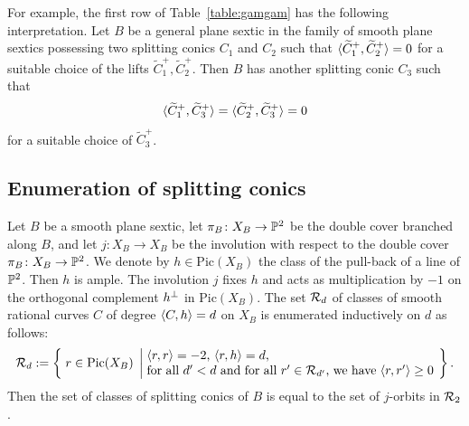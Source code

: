 \documentclass{amsart} %
\newcommand{\ps}{B}
\newcommand{\con}{C}
\newcommand{\wtcon}{\widetilde{\con}}
\newcommand{\pips}{\pi_{\ps}}
\newcommand{\Xps}{X_{\ps}}
\newcommand{\Pic}{\mathrm{Pic}}
\begin{document}
%
For example, the first row of Table~\ref{table:gamgam} has the following interpretation.
Let  $\ps$ be a general plane sextic 
in the family of smooth plane sextics possessing 
two splitting conics $\con_1$ and $\con_2$
such that $\intf{\wtcon_1^+, \wtcon_2^+}=0$  for a suitable choice of the lifts 
$\wtcon_1^+, \wtcon_2^+$.
Then  $\ps$ has another  splitting conic $\con_3$ such that 
\[
\intf{\wtcon_1^+, \wtcon_3^+}=\intf{\wtcon_2^+, \wtcon_3^+}=0
\]
for a suitable choice of $\wtcon_3^+$.
%
\subsection{Enumeration of splitting conics}\label{subsec:enum}
%
Let $\ps$ be a smooth plane sextic,
 let $\pips\colon \Xps\to \PP^2$ be the double cover branched along $\ps$,
 and let $j\colon X_{\ps}\to X_{\ps}$ be the involution 
 with respect to the double cover $\pips\colon \Xps\to \PP^2$.
We denote by  $h\in  \Pic(\Xps)$   the class  of the pull-back of a line of $\mathord{\mathbb{P}}^2$.
Then $h$ is ample.
The involution $j$
fixes $h$ and acts as multiplication by $-1$
on the orthogonal complement $h^{\perp}$ in $ \Pic(\Xps)$.
The set $\mathord{\mathcal{R}}_d$ of classes of smooth rational curves $C$ of 
degree $\langle C, h \rangle=d$ on $X_{\ps}$ 
is  enumerated 
inductively on $d$ as follows:
\[
\RRR_d:=\bigset{r\in \Pic(X_{\ps})}
{\parbox{8cm}{$\intf{r, r}=-2$, $\intf{r, h}=d$, \\
for all $d\sprime<d$ and for all $r\sprime\in \RRR_{d\sprime}$, we have 
$\intf{r, r\sprime}\ge 0$}
}.
\]
Then the set of classes of splitting conics of $\ps$ is equal to 
the set of $j$-orbits in $\mathord{\mathcal{R}}_2$.
%
\end{document}
